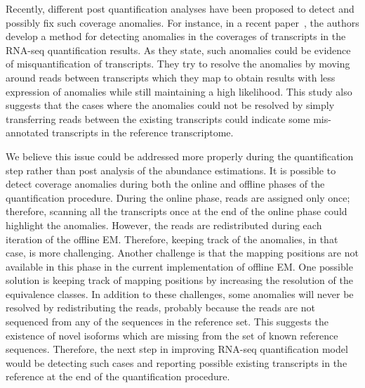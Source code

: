 Recently, different post quantification analyses have been proposed to detect and possibly fix such
coverage anomalies. For instance, in a recent paper~\cite{ma2019detecting}, the authors develop a method for
detecting anomalies in the coverages of transcripts in the RNA-seq quantification results. As they state,
such anomalies could be evidence of misquantification of transcripts. They try to resolve the anomalies by
moving around reads between transcripts which they map to obtain results with less expression of anomalies
while still maintaining a high likelihood. This study also suggests that the cases where the anomalies could
not be resolved by simply transferring reads between the existing transcripts could indicate some mis-annotated
transcripts in the reference transcriptome.
 
 
We believe this issue could be addressed more properly during the quantification step rather than post
analysis of the abundance estimations.
It is possible to detect coverage anomalies during both the online
and offline phases of the quantification procedure. During the online phase, reads are assigned only once; therefore, scanning all the transcripts once at the end of the online phase could highlight the anomalies. However,
the reads are redistributed during each iteration of the offline EM. Therefore, keeping track of the anomalies, in that case, is more challenging. Another challenge is that the mapping positions are not available in this phase in the current implementation of offline EM. One possible solution is keeping track of mapping positions by increasing the resolution of the equivalence classes. In addition to these challenges, some anomalies will never be resolved by redistributing the reads, probably because the reads are not sequenced from any of
the sequences in the reference set. This suggests the existence of novel isoforms which are missing from the set of known reference sequences. Therefore, the next step in improving RNA-seq quantification model would be detecting such cases and
reporting possible existing transcripts in the reference at the end of the quantification procedure.